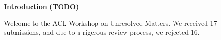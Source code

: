 \documentclass[11pt]{article}
\begin{document}
\begin{center}
  {\Large \bf Introduction (TODO)}
\end{center}

\vspace*{0.5cm}


Welcome to the ACL Workshop on Unresolved Matters. We received
17 submissions, and due to a rigerous review process, we rejected 16. 
\end{document}
